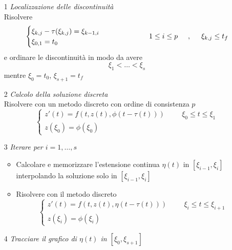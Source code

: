 \begin{itemize}

\item[1] \textit{Localizzazione delle discontinuità} \vspace{0.5cm}	\\
	Risolvere
	    $$
	    \begin{cases}
    	    \xi_{k,j} - \tau (\xi_{k,j}) = \xi_{k-1,i}\\
	    \xi_{0,1}=t_0
	    \end{cases}
	    \hspace{2cm}
	    1 \le i \le p	\hspace{0.5cm} , \hspace{0.5cm}	\xi_{k,j} \le t_f
	    $$
	e ordinare le discontinuità in modo da avere
	  $$
	  \xi_1	< \dots	< \xi_s
	  $$
      mentre  $\xi_0=t_0$, $\xi_{s+1}=t_f$
\item[2] \textit{Calcolo della soluzione discreta} \vspace{0.5cm}	\\
	 Risolvere con un metodo discreto con ordine di consistenza $p$
	  $$
	  \begin{cases}
	   z'(t) = f(t,z(t),\phi(t-\tau(t)))	\hspace{1cm}	\xi_0 \le t \le \xi_1	\\
	   z(\xi_0)=\phi(\xi_0)
	  \end{cases}
	  $$

\item[3] \textit{Iterare per $i=1, \dots, s$} \vspace{0.5cm}
	  \begin{itemize}
	   \item 
		Calcolare e memorizzare l'estensione continua $\eta(t)$ in $[\xi_{i-1},\xi_i]$ interpolando la soluzione solo in $ [\xi_{i-1},\xi_i]$
	  
	   \item
		Risolvere con il metodo discreto
			  $$
			  \begin{cases}
			  z'(t) = f(t,z(t),\eta(t-\tau(t)))	\hspace{1cm}	\xi_i \le t \le \xi_{i+1}	\\
			  z(\xi_i)=\phi(\xi_i)
			  \end{cases}
			  $$
	  \end{itemize}
\item[4] \textit{Tracciare il grafico di $\eta(t)$ in $[\xi_0,\xi_{s+1}]$}

\end{itemize}


